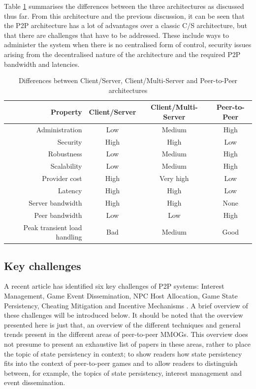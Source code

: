 \documentclass[10pt,a4paper,journal,cspaper,compsoc]{IEEEtran}
\begin{document}
Table \ref{tab_archs} summarises the differences between the three architectures as discussed thus far. From this architecture and the previous
discussion, it can be seen that the P2P architecture has a lot of advantages over a classic C/S architecture, but that there are challenges that have
to be addressed. These include ways to administer the system when there is no centralised form of control, security issues arising from the
decentralised nature of the architecture and the required P2P bandwidth and latencies.
%
\begin{table}[htbp]
\centering
\begin{tabular}{|r|c|c|c|}
\hline
Property & Client/Server & Client/Multi-Server & Peer-to-Peer\\
\hline
Administration & Low & Medium & High\\
Security & High & High & Low\\
Robustness & Low & Medium & High\\
Scalability & Low & Medium & High\\
Provider cost & High & Very high & Low\\
Latency & High & High & Low\\
Server bandwidth & High & High & None\\
Peer bandwidth & Low & Low & High\\
Peak transient load handling & Bad & Medium & Good\\
\hline
\end{tabular}
\caption{Differences between Client/Server, Client/Multi-Server and Peer-to-Peer architectures} \label{tab_archs}
\end{table}


\subsection{Key challenges}
\label{key_challenges}

A recent article has identified six key challenges of P2P systems: Interest Management, Game Event Dissemination, NPC Host Allocation, Game State
Persistency, Cheating Mitigation and Incentive Mechanisms \cite{Fan_deisgn_issues_p2p}. A brief overview of these challenges will be introduced
below. It should be noted that the overview presented here is just that, an overview of the different techniques and general trends present in the
different areas of peer-to-peer MMOGs. This overview does not presume to present an exhaustive list of papers in these areas, rather to place the
topic of state persistency in context; to show readers how state persistency fits into the context of peer-to-peer games and to allow readers to
distinguish between, for example, the topics of state persistency, interest management and event dissemination.
\end{document}
